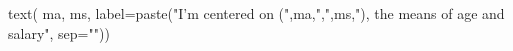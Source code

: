 \begin{Schunk}
\begin{Sinput}
 text( ma, ms, label=paste("I'm centered on (",ma,",",ms,"), the means of age and salary", sep=""))
\end{Sinput}
\end{Schunk}
